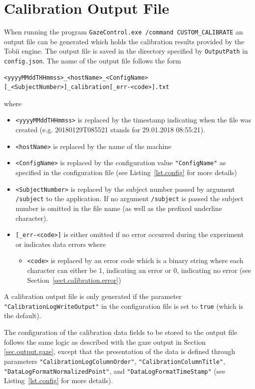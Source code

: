 \documentclass[a4paper,oneside]{book}
\begin{document}
\section{Calibration Output File}
When running the program \texttt{GazeControl.exe /command CUSTOM\_CALIBRATE} an output file can be generated which holds the calibration results provided by the Tobii engine.
The output file is saved in the directory specified by \texttt{OutputPath} in \texttt{config.json}.
The name of the output file follows the form
\begin{lstlisting}
<yyyyMMddTHHmmss>_<hostName>_<ConfigName>[_<SubjectNumber>]_calibration[_err-<code>].txt
\end{lstlisting}
where
\begin{itemize}
    \item \texttt{<yyyyMMddTHHmmss>} is replaced by the timestamp indicating when the file was created (e.g. 20180129T085521 stands for 29.01.2018 08:55:21).
    \item \texttt{<hostName>} is replaced by the name of the machine
    \item \texttt{<ConfigName>} is replaced by the configuration value \texttt{"ConfigName"} as specified in the configuration file (see Listing~\ref{lst.config} for more details)
    \item \texttt{<SubjectNumber>} is replaced by the subject number passed by argument \texttt{/subject} to the application.
        If no argument \texttt{/subject} is passed the subject number is omitted in the file name (as well as the prefixed underline character).
    \item \texttt{[\_err-<code>]} is either omitted if no error occurred during the experiment or indicates data errors where
        \begin{itemize}
            \item \texttt{<code>} is replaced by an error code which is a binary string where each character can either be 1, indicating an error or 0, indicating no error (see Section~\ref{sect.calibration.error})
        \end{itemize}
\end{itemize}

A calibration output file is only generated if the parameter \texttt{"CalibrationLogWriteOutput"} in the configuration file is set to \texttt{true} (which is the default).

The configuration of the calibration data fields to be stored to the output file follows the same logic as described with the gaze output in Section \ref{sec.output.gaze}, except that the presentation of the data is defined through parameters \texttt{"CalibrationLogColumnOrder"}, \texttt{"CalibrationColumnTitle"}, \texttt{"DataLogFormatNormalizedPoint"}, and \texttt{"DataLogFormatTimeStamp"} (see Listing~\ref{lst.config} for more details).
\end{document}
